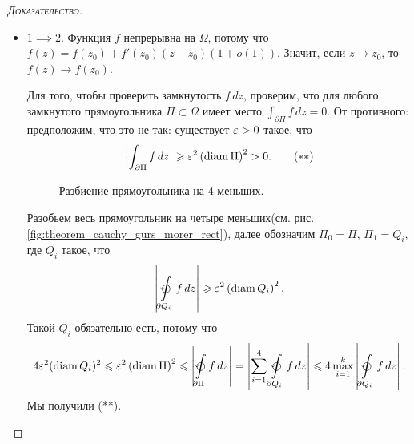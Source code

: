 \documentclass[../complex-analysis.tex]{subfiles}
\begin{document}
\begin{proof}[\normalfont\textsc{Доказательство}]\
 \begin{itemize}
  \item $1 \implies 2$. Функция $f$ непрерывна на $\Omega$, потому что $f(z) = f(z_0) + f'(z_0)(z-z_0)(1+o(1))$. Значит, если $z \to z_0$, то $f(z) \to f(z_0)$.

 Для того, чтобы проверить замкнутость $f \, dz$, проверим, что для любого замкнутого прямоугольника $\Pi \subset \Omega$ имеет место $\int_{\partial\Pi} f\,dz =0 $. От противного: предположим, что это не так: существует $\varepsilon > 0$ такое, что 
\begin{align*}
 \left|\int_{\partial\Pi} f\,dz  \right|  \geqslant \varepsilon^{2}\left( \operatorname{diam} \Pi \right)^{2} > 0. \qquad ( \ast\ast )
\end{align*}
\begin{figure}[ht]
    \centering
    \caption{Разбиение прямоугольника на 4 меньших.}
    \label{fig:theorem_cauchy_gurs_morer_rect}
\end{figure}

 Разобьем весь прямоугольник на четыре меньших(см. рис. \eqref{fig:theorem_cauchy_gurs_morer_rect}), далее обозначим $\Pi_0 = \Pi$, $\Pi_1 = Q_i$, где $Q_i$ такое, что 
 \begin{align*}
  \left| \varointctrclockwise\limits_{\partial Q_i}  f\,dz \right| \geqslant \eps^{2} \left( \diam Q_i \right)^{2}.
 \end{align*} Такой $Q_i$ обязательно есть, потому что
 \begin{align*}
  4\eps^{2}(\diam Q_i)^{2} \leqslant \eps^{2} \left( \diam \Pi \right)^{2} \leqslant \left| \varointctrclockwise\limits_{\partial \Pi} f\,dz   \right| = \left| \sum_{i=1}^{4} \varointctrclockwise\limits_{\partial Q_i} f\,dz    \right| \leqslant 4 \max_{i=1}^{k} \left| \varointctrclockwise\limits_{\partial Q_i} f\,dz   \right|.
 \end{align*} Мы получили (**).


\end{itemize}
\end{proof}
\end{document}
